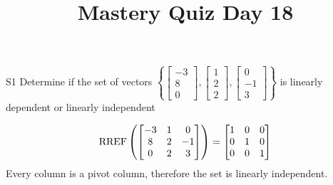\documentclass{sbgLAquiz}
\title{Mastery Quiz Day 18 }
\begin{document}
\begin{problem}{S1}
Determine if the set of vectors $\left\{ \begin{bmatrix} -3 \\ 8 \\ 0 \end{bmatrix}, \begin{bmatrix} 1 \\ 2 \\ 2 \end{bmatrix}, \begin{bmatrix} 0 \\ -1 \\ 3 \end{bmatrix} \right\}$ is  linearly dependent or linearly independent
\end{problem}
\begin{solution}
$$\operatorname{RREF}\left( \begin{bmatrix}-3 & 1 & 0 \\ 8 & 2 & -1 \\ 0 & 2 & 3 \end{bmatrix}\right) = \begin{bmatrix} 1 & 0 & 0 \\ 0 & 1 & 0 \\ 0 & 0 & 1 \end{bmatrix}$$ 
Every column is a pivot column, therefore the set is linearly independent.
\end{solution}
\end{document}
